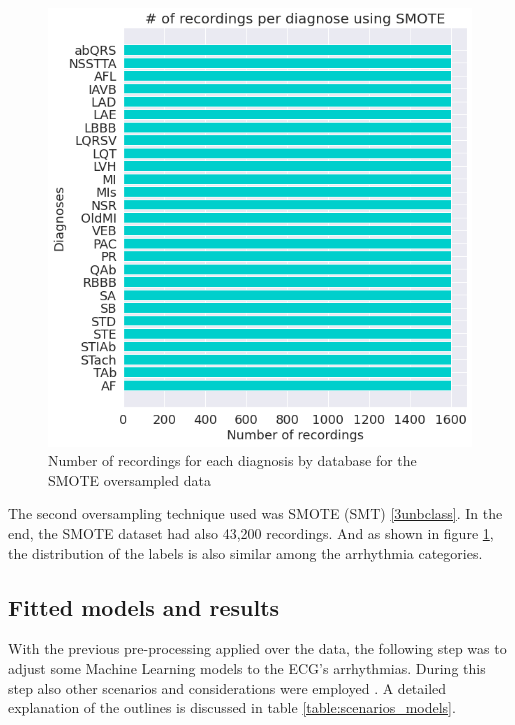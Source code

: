 \begin{figure}[H]
\centering
\includegraphics[scale=0.4]{img/label_distro_smote.png}
\caption{Number of recordings for each diagnosis by database for the SMOTE oversampled data}
\label{fig:label_distro_smote}
\end{figure}

The second oversampling technique used was SMOTE (SMT) \ref{3unbclass}. In the end, the SMOTE dataset had also 43,200 recordings. And as shown in figure \ref{fig:label_distro_smote}, the distribution of the labels is also similar among the arrhythmia categories.

\subsection{Fitted models and results}

With the previous pre-processing applied over the data, the following step was to adjust some Machine Learning models to the ECG's arrhythmias. During this step also other scenarios and considerations were employed \cite{datasplit}. A detailed explanation of the outlines is discussed in table \ref{table:scenarios_models}.

